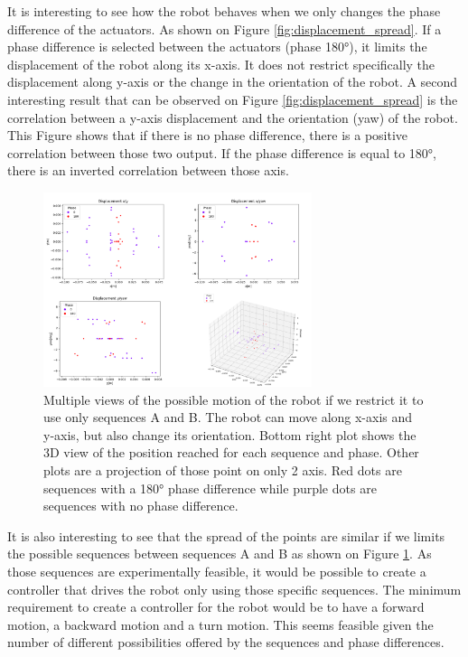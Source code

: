         It is interesting to see how the robot behaves when we only changes the phase difference of the actuators. As shown on Figure \ref{fig:displacement_spread}. If a phase difference is selected between the actuators (phase 180°), it limits the displacement of the robot along its x-axis. It does not restrict specifically the displacement along y-axis or the change in the orientation of the robot. A second interesting result that can be observed on Figure \ref{fig:displacement_spread} is the correlation between a y-axis displacement and the orientation (yaw) of the robot. This Figure shows that if there is no phase difference, there is a positive correlation between those two output. If the phase difference is equal to 180°, there is an inverted correlation between those axis. \\
        
        \begin{figure}
            \centering
            \includegraphics[width=0.7\textwidth]{images/displacement_spread_AB.png}
            \caption{Multiple views of the possible motion of the robot if we restrict it to use only sequences A and B. The robot can move along x-axis and y-axis, but also change its orientation. Bottom right plot shows the 3D view of the position reached for each sequence and phase. Other plots are a projection of those point on only 2 axis. Red dots are sequences with a 180° phase difference while purple dots are sequences with no phase difference.}
            \label{fig:spreadAB}
        \end{figure}
        
        It is also interesting to see that the spread of the points are similar if we limits the possible sequences between sequences A and B as shown on Figure \ref{fig:spreadAB}. As those sequences are experimentally feasible, it would be possible to create a controller that drives the robot only using those specific sequences. The minimum requirement to create a controller for the robot would be to have a forward motion, a backward motion and a turn motion. This seems feasible given the number of different possibilities offered by the sequences and phase differences.\\
        
